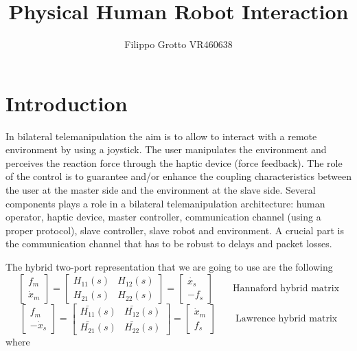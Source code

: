 \documentclass[a4paper,12pt]{article}
\begin{document}
\author{Filippo Grotto VR460638}

\title{Physical Human Robot Interaction}

\maketitle
\tableofcontents

\section{Introduction}
In bilateral telemanipulation the aim is to allow to interact with a remote environment by using a joystick. The user manipulates the environment and perceives the reaction force through the haptic device (force feedback). The role of the control is to guarantee and/or enhance the coupling characteristics between the user at the master side and the environment at the slave side. Several components plays a role in a bilateral telemanipulation architecture: human operator, haptic device, master controller, communication channel (using a proper protocol), slave controller, slave robot and environment. A crucial part is the communication channel that has to be robust to delays and packet losses. 

\bigskip
\noindent The hybrid two-port representation that we are going to use are the following
\[
    \begin{bmatrix}
        f_m \\ \dot{x}_m
    \end{bmatrix} = \begin{bmatrix}
        H_{11}(s) & H_{12}(s) \\ H_{21}(s) & H_{22}(s)
    \end{bmatrix} = \begin{bmatrix}
        \dot{x_s} \\ -f_s
    \end{bmatrix} \qquad \text{Hannaford hybrid matrix}
\]
\[
    \begin{bmatrix}
        f_m \\ -\dot{x}_s
    \end{bmatrix} = \begin{bmatrix}
        \bar{H_{11}}(s) & \bar{H_{12}}(s) \\ \bar{H_{21}}(s) &\bar{ H_{22}}(s)
    \end{bmatrix} = \begin{bmatrix}
        \dot{x}_m \\ f_s
    \end{bmatrix} \qquad \text{Lawrence hybrid matrix}
\]
where 
\end{document}
